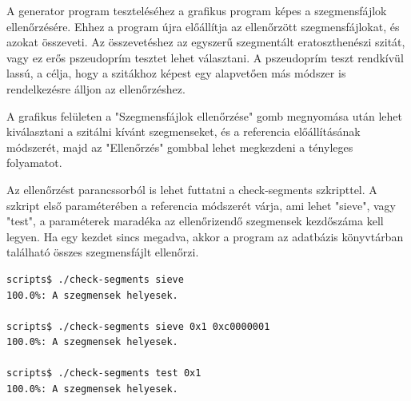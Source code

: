 A generator program teszteléséhez a grafikus program képes a szegmensfájlok ellenőrzésére.
Ehhez a program újra előállítja az ellenőrzött szegmensfájlokat, és azokat összeveti.
Az összevetéshez az egyszerű szegmentált eratoszthenészi szitát, vagy ez erős pszeudoprím tesztet lehet választani.
A pszeudoprím teszt rendkívül lassú, a célja, hogy a szitákhoz képest egy alapvetően más módszer is rendelkezésre álljon az ellenőrzéshez.

A grafikus felületen a "Szegmensfájlok ellenőrzése" gomb megnyomása után lehet kiválasztani a szitálni kívánt szegmenseket, és a referencia előállításának módszerét, majd az "Ellenőrzés" gombbal lehet megkezdeni a tényleges folyamatot.

Az ellenőrzést parancssorból is lehet futtatni a check-segments szkripttel.
A szkript első paraméterében a referencia módszerét várja, ami lehet "sieve", vagy "test", a paraméterek maradéka az ellenőrizendő szegmensek kezdőszáma kell legyen.
Ha egy kezdet sincs megadva, akkor a program az adatbázis könyvtárban található összes szegmensfájlt ellenőrzi.

\begin{lstlisting}[language=bash]
scripts$ ./check-segments sieve
100.0%: A szegmensek helyesek.             

scripts$ ./check-segments sieve 0x1 0xc0000001
100.0%: A szegmensek helyesek.             

scripts$ ./check-segments test 0x1
100.0%: A szegmensek helyesek.             

\end{lstlisting}

